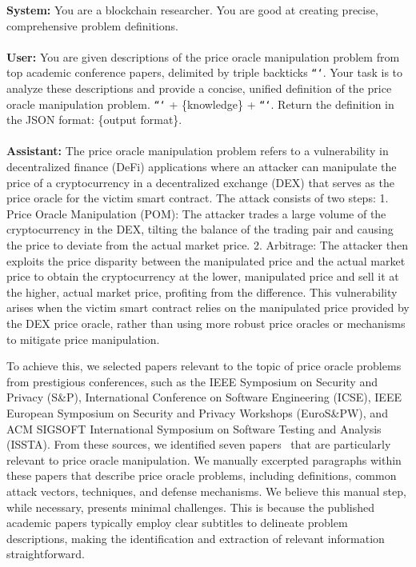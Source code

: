 \begin{tcolorbox}[float, colback=gray!20, colframe=gray!50, title={Knowledge Synthesizing Example}, label=knowledgesynthesizer]
\textbf{System:} You are a blockchain researcher. You are good at creating precise, comprehensive problem definitions. \\
\\
\textbf{User:} You are given descriptions of the price oracle manipulation problem from top academic conference papers, delimited by triple backticks \texttt{```}. Your task is to analyze these descriptions and provide a concise, unified definition of the price oracle manipulation problem. \texttt{```} + \{knowledge\} + \texttt{```}. Return the definition in the JSON format: \{output format\}. \\
\\
\textbf{Assistant:} The price oracle manipulation problem refers to a vulnerability in decentralized finance (DeFi) applications where an attacker can manipulate the price of a cryptocurrency in a decentralized exchange (DEX) that serves as the price oracle for the victim smart contract. The attack consists of two steps: 1. Price Oracle Manipulation (POM): The attacker trades a large volume of the cryptocurrency in the DEX, tilting the balance of the trading pair and causing the price to deviate from the actual market price. 2. Arbitrage: The attacker then exploits the price disparity between the manipulated price and the actual market price to obtain the cryptocurrency at the lower, manipulated price and sell it at the higher, actual market price, profiting from the difference. This vulnerability arises when the victim smart contract relies on the manipulated price provided by the DEX price oracle, rather than using more robust price oracles or mechanisms to mitigate price manipulation.
\end{tcolorbox}

To achieve this, we selected papers relevant to the topic of price oracle problems from prestigious conferences, such as the IEEE Symposium on Security and Privacy (S\&P), International Conference on Software Engineering (ICSE), IEEE European Symposium on Security and Privacy Workshops (EuroS\&PW), and ACM SIGSOFT International Symposium on Software Testing and Analysis (ISSTA).
From these sources, we identified seven papers~\cite{xi2024pomabuster,deng2024safeguarding,zhang2023demystifying,wu2021defiranger,wang2021promutator,kong2023defitainter, mo2023toward} that are particularly relevant to price oracle manipulation.
We manually excerpted paragraphs within these papers that describe price oracle problems, including definitions, common attack vectors, techniques, and defense mechanisms. 
We believe this manual step, while necessary, presents minimal challenges. This is because the published academic papers typically employ clear subtitles to delineate problem descriptions, making the identification and extraction of relevant information straightforward.

